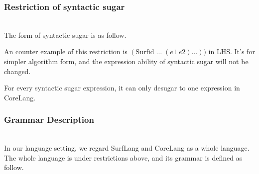 \subsubsection{Restriction of syntactic sugar}
\hfill\\
The form of syntactic sugar is as follow.

An counter example of this restriction is $(\mbox{Surfid}\;\ldots\;(e1\;e2)\ldots))$ in LHS. It's for simpler algorithm form, and the expression ability of syntactic sugar will not be changed.

\begin{Def}[Unambiguous]
For every syntactic sugar expression, it can only desugar to one expression in CoreLang.
\end{Def}

\subsubsection{Grammar Description}
\hfill\\
In our language setting, we regard SurfLang and CoreLang as a whole language. The whole language is under restrictions above, and its grammar is defined as follow.

